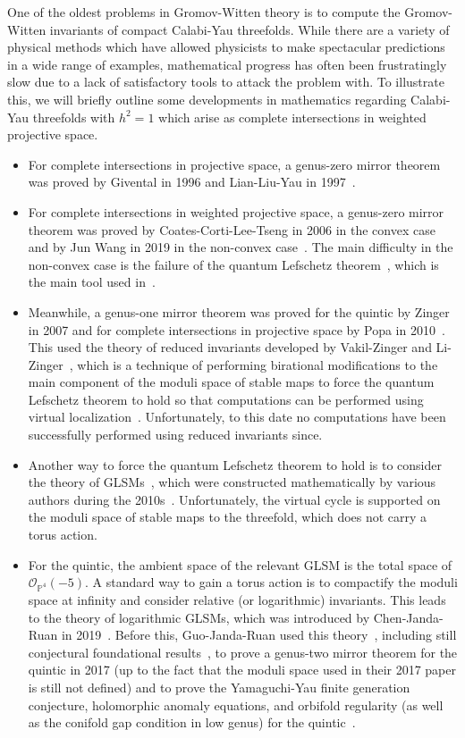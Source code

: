 \documentclass[10pt]{amsart}
\theoremstyle{definition}
\theoremstyle{remark}
\theoremstyle{plain}
\theoremstyle{definition}
\theoremstyle{remark}
\renewcommand{\P}{\mathbb{P}}
\newcommand{\mc}[1]{\mathcal{#1}}
\newcommand{\1}{\mathbf{1}}
\newcommand{\2}{\mathbf{2}}
\newcommand{\3}{\mathbf{3}}
\begin{document}
One of the oldest problems in Gromov-Witten theory is to compute the Gromov-Witten invariants of compact Calabi-Yau threefolds. While there are a variety of physical methods which have allowed physicists to make spectacular predictions in a wide range of examples, mathematical progress has often been frustratingly slow due to a lack of satisfactory tools to attack the problem with. To illustrate this, we will briefly outline some developments in mathematics regarding Calabi-Yau threefolds with $h^2 = 1$ which arise as complete intersections in weighted projective space.
\begin{itemize}
    \item For complete intersections in projective space, a genus-zero mirror theorem was proved by Givental in 1996 and Lian-Liu-Yau in 1997~\cite{eqgwinv,lly}.
    \item For complete intersections in weighted projective space, a genus-zero mirror theorem was proved by Coates-Corti-Lee-Tseng in 2006 in the convex case and by Jun Wang in 2019 in the non-convex case~\cite{orbqcohwproj,mirrornonconvex}. The main difficulty in the non-convex case is the failure of the quantum Lefschetz theorem~\cite{qrr}, which is the main tool used in~\cite{eqgwinv,lly,orbqcohwproj}.
    \item Meanwhile, a genus-one mirror theorem was proved for the quintic by Zinger in 2007 and for complete intersections in projective space by Popa in 2010~\cite{reducedgenus1,popagenus1ci}. This used the theory of reduced invariants developed by Vakil-Zinger and Li-Zinger~\cite{desingularizationgenusone,g1cilizinger}, which is a technique of performing birational modifications to the main component of the moduli space of stable maps to force the quantum Lefschetz theorem to hold so that computations can be performed using virtual localization~\cite{virtloc}. Unfortunately, to this date no computations have been successfully performed using reduced invariants since.
    \item Another way to force the quantum Lefschetz theorem to hold is to consider the theory of GLSMs~\cite{mirrorandglsm}, which were constructed mathematically by various authors during the 2010s~\cite{glsm,faverokim}. Unfortunately, the virtual cycle is supported on the moduli space of stable maps to the threefold, which does not carry a torus action.
    \item For the quintic, the ambient space of the relevant GLSM is the total space of $\mc{O}_{\P^4}(-5)$. A standard way to gain a torus action is to compactify the moduli space at infinity and consider relative (or logarithmic) invariants. This leads to the theory of logarithmic GLSMs, which was introduced by Chen-Janda-Ruan in 2019~\cite{logglsm}. Before this, Guo-Janda-Ruan used this theory~\cite{puncturedlogr}, including still conjectural foundational results~\cite{structurelog1,structurelog3}, to prove a genus-two mirror theorem for the quintic in 2017 (up to the fact that the moduli space used in their 2017 paper is still not defined) and to prove the Yamaguchi-Yau finite generation conjecture, holomorphic anomaly equations, and orbifold regularity (as well as the conifold gap condition in low genus) for the quintic~\cite{genus2logglsm,bcovlogglsm}.

\end{itemize}
\end{document}
